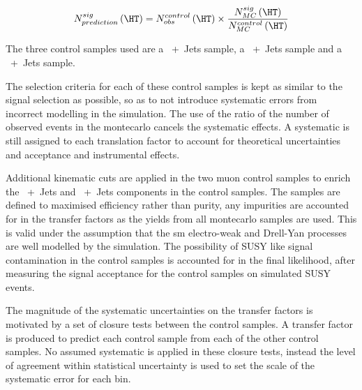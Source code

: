 \begin{equation}
  N^{sig}_{prediction}\left(\HT\right) = N_{obs}^{control}\left(\HT\right) \times \frac{N_{MC}^{sig}\left(\HT\right)}{N_{MC}^{control}\left(\HT\right)}
\label{eq:traslationfactor}
\end{equation}


The three control samples used are a \HepProcess{\PW\to\Pmu\APnu}~+~Jets 
sample, a \HepProcess{\PZ\to\Pmu\Pmu}~+~Jets sample and a 
\HepProcess{\Pphoton}~+~Jets sample.

The selection criteria for each of these control samples is kept as similar to 
the signal selection as possible, so as to not introduce systematic errors from 
incorrect modelling in the simulation. The use of the ratio of the number of 
observed events in the montecarlo cancels the systematic effects. A systematic 
is still assigned to each translation factor to account for theoretical 
uncertainties and acceptance and instrumental effects.

Additional kinematic cuts are applied in the two muon control samples to enrich 
the \HepProcess{\PW}~+~Jets \HepProcess{\Ptop\APtop} and 
\HepProcess{\PZ}~+~Jets components in the control samples. The samples are 
defined to maximised efficiency rather than purity, any impurities are 
accounted for in the transfer factors as the yields from all montecarlo samples 
are used. This is valid under the assumption that the \ac{sm} 
electro-weak and Drell-Yan processes are well modelled by the simulation.
The possibility of SUSY like signal contamination in the control samples is 
accounted for in the final likelihood, after measuring the signal acceptance 
for the control samples on simulated SUSY events.

The magnitude of the systematic uncertainties on the transfer factors is 
motivated by a set of closure tests between the control samples. A transfer 
factor is produced to predict each control sample from each of the other 
control samples. No assumed systematic is applied in these closure tests, 
instead the level of agreement within statistical uncertainty is used to set 
the scale of the systematic error for each \HT bin.


